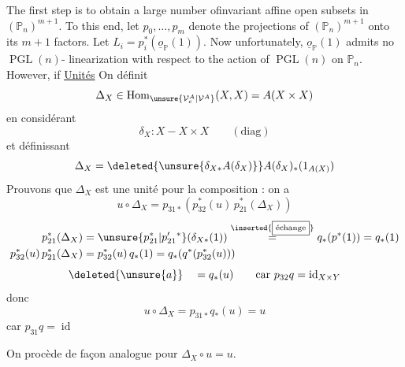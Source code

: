  The first step is to obtain a large number of\inserted{\ }invariant affine
open subsets in $(\mathbb P_n)^{m+1}$. To this end, let $p_0,\ldots,p_m$ denote
the projections of $(\mathbb P_n)^{m+1}$ onto its $m+1$ factors. Let
$L_i=p_i^*(\underline{o}_{\mathbb P}(1))$. Now unfortunately, $\underline{o}_{\mathbb P}(1)$ admits no $\operatorname{PGL}(n)$-
linearization with respect to the action of $\operatorname{PGL}(n)$ on $\mathbb P_n$. However, if
\uline{Unités} On définit
\[
\Delta_X\in\operatorname{Hom}_{\unsure{\mathcal V_c^A|\mathcal V^A}}(X,X)=A(X\times X)
\]
en considérant
\[
\delta_X:X-X\times X\qquad(\mathrm{diag})
\]
et définissant
\[
\Delta_X=\deleted{\unsure{\delta_{X*}A(\delta_X)}}A(\delta_X)_*(1_{A(X)})
\]
Prouvons que $\Delta_X$ est une unité  pour la
composition : on a
\[
u\circ\Delta_X=p_{31*}(p_{32}^*(u)\,p_{21}^*(\Delta_X))
\]
\[
\begin{aligned}
p_{21}^*(\Delta_X)&=\unsure{p_{21}^*|p'_{21}{}^*}(\delta_{X*}(1))
\overset{\text{\inserted{\fbox{échange}}}}=q_*(p^*(1))=q_*(1)\\
p_{32}^*(u)\,p_{21}^*(\Delta_X)&=p_{32}^*(u)\,q_*(1)=q_*(q^*(p_{32}^*(u)))
\end{aligned}
\]
\[
\deleted{\unsure{a}}\quad=q_*(u)\qquad\text{car }p_{32}q=\operatorname{id}_{X\times Y}
\]
donc
\[
u\circ\Delta_X=p_{31*}q_*(u)=u
\]
car  $p_{31}q=\operatorname{id}$

On procède de façon analogue pour $\Delta_X\circ u=u$.

